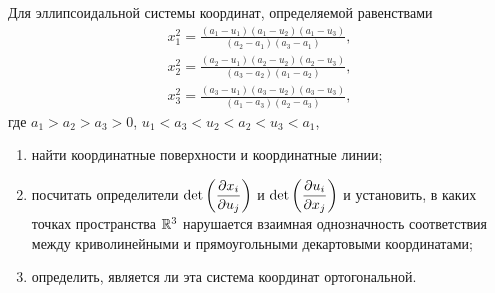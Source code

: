 \begin{problem}
	Для эллипсоидальной системы координат, определяемой равенствами
	\begin{gather*}
		x_1^2 = \frac{(a_1 - u_1)(a_1 - u_2)(a_1 - u_3)}{(a_2 - a_1)(a_3 - a_1)},\\
		x_2^2 = \frac{(a_2 - u_1)(a_2 - u_2)(a_2 - u_3)}{(a_3 - a_2)(a_1 - a_2)},\\
		x_3^2 = \frac{(a_3 - u_1)(a_3 - u_2)(a_3 - u_3)}{(a_1 - a_3)(a_2 - a_3)},
	\end{gather*}
	где $a_1 > a_2 > a_3 > 0$, $u_1 < a_3 < u_2 < a_2 < u_3 < a_1$,
	\begin{enumerate}[nolistsep, label=(\arabic*)]
		\item найти координатные поверхности и координатные линии;
		\item посчитать определители $\displaystyle\det\left(\frac{\partial x_i}{\partial u_j}\right)$ и $\displaystyle\det\left(\frac{\partial u_i}{\partial x_j}\right)$ и установить, в каких точках пространства $\mathbb{R}^3$ нарушается взаимная однозначность соответствия между криволинейными и прямоугольными декартовыми координатами;
		\item определить, является ли эта система координат ортогональной.
	\end{enumerate}
\end{problem}

